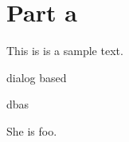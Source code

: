\documentclass{article}
\begin{document}
\section*{Part a}

This is is a sample text.

dialog based

dbas

She is foo.
\end{document}
